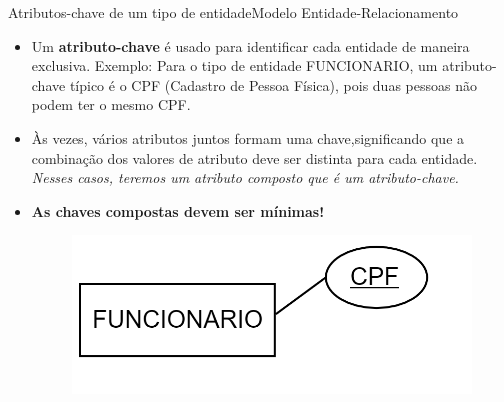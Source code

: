 \documentclass[t]{beamer}
\begin{document}
\begin{ftst}{Atributos-chave de um tipo de entidade}{Modelo Entidade-Relacionamento}
\small
\begin{itemize}
    \item Um \textbf{atributo-chave} é usado para identificar cada entidade de maneira exclusiva. Exemplo: Para o tipo de entidade FUNCIONARIO, um atributo-chave típico é o CPF (Cadastro de Pessoa Física), pois duas pessoas não podem ter o mesmo CPF.
    
    \item Às vezes, vários atributos juntos formam uma chave,significando que a combinação dos valores de atributo deve ser distinta para cada entidade.\textit{ Nesses casos, teremos um atributo composto que é um atributo-chave.}
    
    \item \textbf{As chaves compostas devem ser mínimas!}
    \begin{figure}
        \centering
        \includegraphics[scale=0.2]{Figuras/01_7.png}
    \end{figure}
\end{itemize}

\end{ftst}

\end{document}

